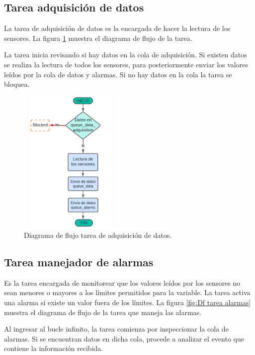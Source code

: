 \subsection{Tarea adquisición de datos} 
La tarea de adquisición de datos es la encargada de hacer la lectura de los sensores. La figura \ref{fig:Df tarea adquisicion} muestra el diagrama de flujo de la tarea. 

La tarea inicia revisando si hay datos en la cola de adquisición. Si existen datos se realiza la lectura de todos los sensores, para posteriormente enviar los  valores leídos por la cola de datos y alarmas. Si no hay datos en la cola la tarea se bloquea. 

\begin{figure}[h]
  \centering
	\includegraphics[width=5cm, height=7cm]{./Figures/DF task adquisicion.png}
	\caption{Diagrama de flujo tarea de adquisición de datos.}
	\label{fig:Df tarea adquisicion}
\end{figure}

\vspace{5cm}
\subsection{Tarea manejador de alarmas} 

Es la tarea encargada de monitorear que los valores leídos por los sensores no sean menores o mayores a los límites permitidos para la variable. La tarea activa una alarma si existe un valor fuera de los límites. La figura \ref{fig:Df tarea alarmas} muestra el diagrama de flujo de la tarea que maneja las alarmas.

Al ingresar al bucle infinito, la tarea comienza por inspeccionar la cola de alarmas. Si se encuentran datos en dicha cola, procede a analizar el evento que contiene la información recibida.


